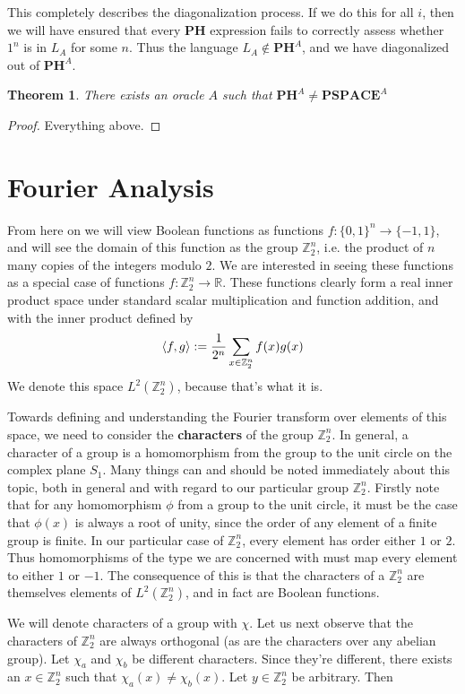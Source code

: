 \documentclass{article}
\theoremstyle{definition}
\theoremstyle{plain}
\theoremstyle{theorem}
\newtheorem{theorem}{Theorem}[section]
\begin{document}
This completely describes the diagonalization process. If we do this for all $i$, then we will have ensured that every $\bm{PH}$ expression fails to correctly assess whether $1^n$ is in $L_A$ for some $n$. Thus the language $L_A \notin \bm{PH}^A$, and we have diagonalized out of $\bm{PH}^A$. 
\begin{theorem}
	There exists an oracle $A$ such that $\bm{PH}^A \neq \bm{PSPACE}^A$
\end{theorem}
\begin{proof}
	Everything above.
\end{proof}
\section{Fourier Analysis}
	From here on we will view Boolean functions as functions $f:\{0,1\}^n \to \{-1,1\}$, and will see the domain of this function as the group $\mathbb{Z}_2^n$, i.e. the product of $n$ many copies of the integers modulo $2$. We are interested in seeing these functions as a special case of functions $f:\mathbb{Z}_2^n \to \mathbb{R}$. These functions clearly form a real inner product space under standard scalar multiplication and function addition, and with the inner product defined by
	\[ \braket{f,g} := \frac{1}{2^n}\sum_{x \in \mathbb{Z}_2^n} f(x)g(x) \]
We denote this space $L^2(\mathbb{Z}_2^n)$, because that's what it is. \par 
Towards defining and understanding the Fourier transform over elements of this space, we need to consider the \textbf{characters} of the group $\mathbb{Z}_2^n$. In general, a character of a group is a homomorphism from the group to the unit circle on the complex plane $S_1$. Many things can and should be noted immediately about this topic, both in general and with regard to our particular group $\mathbb{Z}_2^n$. Firstly note that for any homomorphism $\phi$ from a group to the unit circle, it must be the case that $\phi(x)$ is always a root of unity, since the order of any element of a finite group is finite. In our particular case of $\mathbb{Z}_2^n$, every element has order either $1$ or $2$. Thus homomorphisms of the type we are concerned with must map every element to either $1$ or $-1$. The consequence of this is that the characters of a $\mathbb{Z}_2^n$ are themselves elements of $L^2(\mathbb{Z}_2^n)$, and in fact are Boolean functions. \par 
We will denote characters of a group with $\chi$. Let us next observe that the characters of $\mathbb{Z}_2^n$ are always orthogonal (as are the characters over any abelian group). Let $\chi_a$ and $\chi_b$ be different characters. Since they're different, there exists an $x \in \mathbb{Z}_2^n$ such that $\chi_a(x) \neq \chi_b(x)$. Let $y \in \mathbb{Z}_2^n$ be arbitrary. Then 
\end{document}
